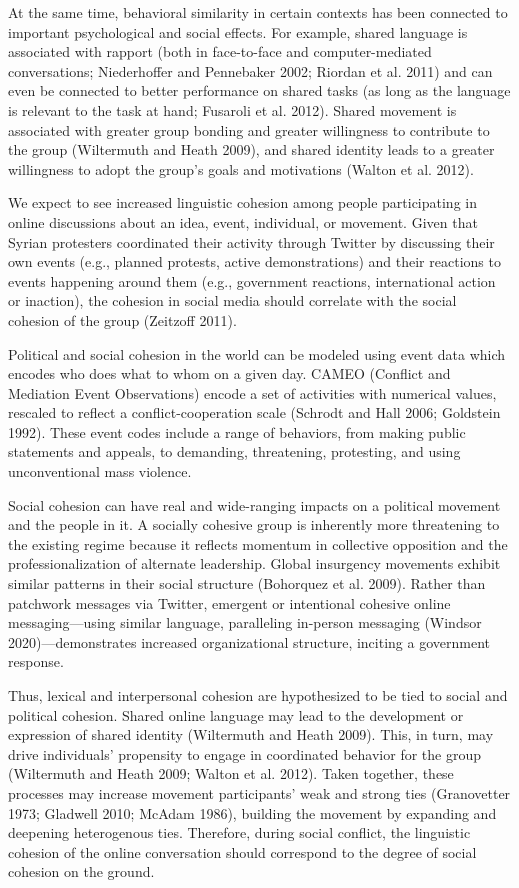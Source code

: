\documentclass[english,man]{apa6}
\begin{document}
At the same time, behavioral similarity in certain contexts has been
connected to important psychological and social effects. For example, shared
language is associated with rapport (both in face-to-face and computer-mediated
conversations; Niederhoffer and Pennebaker 2002; Riordan et al. 2011) and
can even be connected to better performance on shared tasks (as long as
the language is relevant to the task at hand; Fusaroli et al. 2012). Shared
movement is associated with greater group bonding and greater willingness
to contribute to the group (Wiltermuth and Heath 2009), and shared identity
leads to a greater willingness to adopt the group's goals and
motivations (Walton et al. 2012).

We expect to see increased linguistic cohesion among people participating in
online discussions about an idea, event, individual, or movement. Given that
Syrian protesters coordinated their activity through Twitter by discussing their
own events (e.g., planned protests, active demonstrations) and their reactions
to events happening around them (e.g., government reactions, international
action or inaction), the cohesion in social media should correlate with the
social cohesion of the group (Zeitzoff 2011).

Political and social cohesion in the world can be modeled using event data which
encodes who does what to whom on a given day. CAMEO (Conflict and Mediation
Event Observations) encode a set of activities with numerical values, rescaled
to reflect a conflict-cooperation scale (Schrodt and Hall 2006; Goldstein 1992). These event codes include a range of behaviors, from
making public statements and appeals, to demanding, threatening, protesting, and
using unconventional mass violence.

Social cohesion can have real and wide-ranging impacts on a political movement
and the people in it. A socially cohesive group is inherently more threatening
to the existing regime because it reflects momentum in collective opposition and
the professionalization of alternate leadership. Global insurgency movements
exhibit similar patterns in their social structure (Bohorquez et al. 2009).
Rather than patchwork messages via Twitter, emergent or intentional cohesive
online messaging---using similar language, paralleling in-person messaging
(Windsor 2020)---demonstrates increased organizational structure, inciting a
government response.

Thus, lexical and interpersonal cohesion are hypothesized to be tied to social
and political cohesion. Shared online language may lead to the development or
expression of shared identity (Wiltermuth and Heath 2009). This, in turn, may
drive individuals' propensity to engage in coordinated behavior for the group
(Wiltermuth and Heath 2009; Walton et al. 2012). Taken together, these processes may
increase movement participants' weak and strong ties (Granovetter 1973; Gladwell 2010; McAdam 1986), building the movement by expanding and deepening
heterogenous ties. Therefore, during social conflict, the linguistic cohesion
of the online conversation should correspond to the degree of social cohesion on
the ground.
\end{document}
